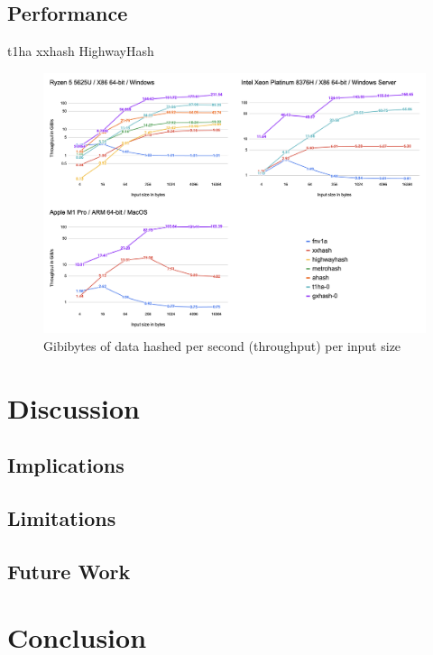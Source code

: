 \documentclass[10pt]{article}
\begin{document}
\clearpage
\subsection{Performance}

t1ha\cite{rust-t1ha} xxhash\cite{twox-hash} HighwayHash\cite{highway-rs}

\begin{figure}[H]
\centering
\includegraphics[width=1\textwidth]{throughput.png}
\caption{Gibibytes of data hashed per second (throughput) per input size}
\label{fig:benchmark-throughput}
\end{figure}


\section{Discussion}
\subsection{Implications}
\subsection{Limitations}
\subsection{Future Work}

\section{Conclusion}



\end{document}
